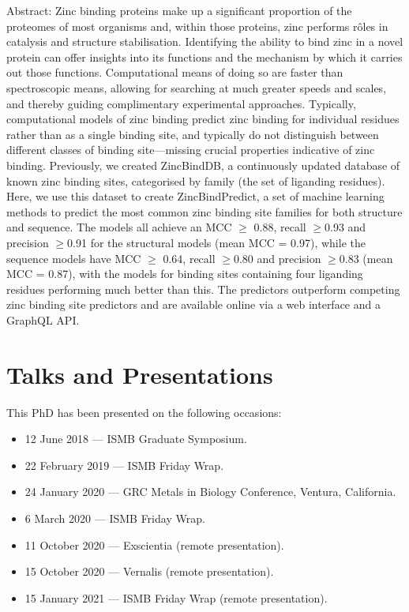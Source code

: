 Abstract: Zinc binding proteins make up a significant proportion of the proteomes of most organisms and, within those proteins, zinc performs rôles in catalysis and structure stabilisation. Identifying the ability to bind zinc in a novel protein can offer insights into its functions and the mechanism by which it carries out those functions. Computational means of doing so are faster than spectroscopic means, allowing for searching at much greater speeds and scales, and thereby guiding complimentary experimental approaches. Typically, computational models of zinc binding predict zinc binding for individual residues rather than as a single binding site, and typically do not distinguish between different classes of binding site—missing crucial properties indicative of zinc binding. Previously, we created ZincBindDB, a continuously updated database of known zinc binding sites, categorised by family (the set of liganding residues). Here, we use this dataset to create ZincBindPredict, a set of machine learning methods to predict the most common zinc binding site families for both structure and sequence. The models all achieve an MCC $\ge$ 0.88, recall $\ge$0.93 and precision $\ge$0.91 for the structural models (mean MCC = 0.97), while the sequence models have MCC $\ge$ 0.64, recall $\ge$0.80 and precision $\ge$0.83 (mean MCC = 0.87), with the models for binding sites containing four liganding residues performing much better than this. The predictors outperform competing zinc binding site predictors and are available online via a web interface and a GraphQL API.


\section{Talks and Presentations}

This PhD has been presented on the following occasions:

\begin{itemize}
  \item 12 June 2018 --- ISMB Graduate Symposium.
  \item 22 February 2019 --- ISMB Friday Wrap.
  \item 24 January 2020 --- GRC Metals in Biology Conference, Ventura, California.
  \item 6 March 2020 --- ISMB Friday Wrap.
  \item 11 October 2020 --- Exscientia (remote presentation).
  \item 15 October 2020 --- Vernalis (remote presentation).
  \item 15 January 2021 --- ISMB Friday Wrap (remote presentation).
\end{itemize}


